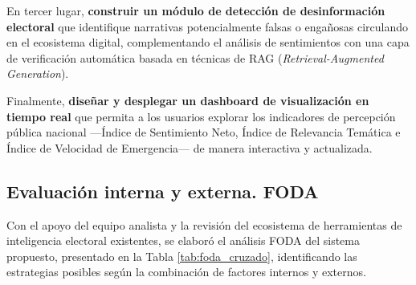 \documentclass[listof=nochaptergap,12pt,times,authoryear]{report}
\begin{document}
En tercer lugar, \textbf{construir un módulo de detección de desinformación electoral} que
identifique narrativas potencialmente falsas o engañosas circulando en el ecosistema
digital, complementando el análisis de sentimientos con una capa de verificación
automática basada en técnicas de RAG (\textit{Retrieval-Augmented Generation}).
 
Finalmente, \textbf{diseñar y desplegar un dashboard de visualización en tiempo real} que
permita a los usuarios explorar los indicadores de percepción pública nacional —Índice
de Sentimiento Neto, Índice de Relevancia Temática e Índice de Velocidad de
Emergencia— de manera interactiva y actualizada.
 
\subsection{Evaluación interna y externa. FODA}
 
Con el apoyo del equipo analista y la revisión del ecosistema de herramientas de
inteligencia electoral existentes, se elaboró el análisis FODA del sistema propuesto,
presentado en la Tabla \ref{tab:foda_cruzado}, identificando las estrategias posibles según
la combinación de factores internos y externos.
 
\end{document}
